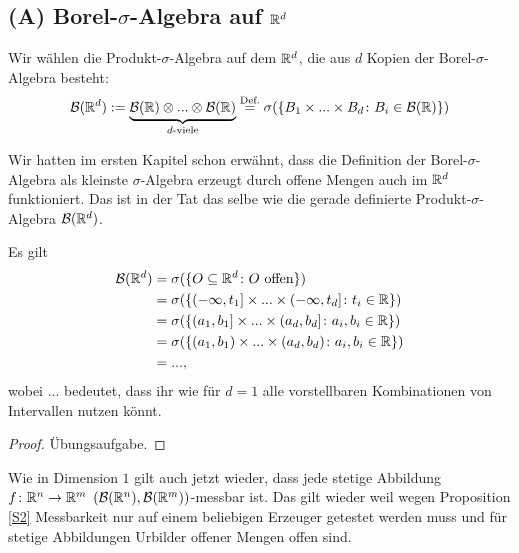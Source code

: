 \subsection*{(A) Borel-$\sigma$-Algebra auf $\mathbb{R}^d$}

\begin{deff}
	Wir w\"ahlen die Produkt-$\sigma$-Algebra auf dem $\mathbb{R}^d$, die aus $d$ Kopien der Borel-$\sigma$-Algebra besteht:
	\[ \mathcal{B}(\mathbb{R}^d) := \underbrace{\mathcal{B}(\mathbb{R}) \otimes ... \otimes \mathcal{B}(\mathbb{R})}_{d\text{-viele}} \overset{\text{Def.}}{=} \sigma(\{ B_1 \times ... \times B_d \colon B_i \in \mathcal{B}(\mathbb{R}) \}) \]
\end{deff}
Wir hatten im ersten Kapitel schon erw\"ahnt, dass die Definition der Borel-$\sigma$-Algebra als kleinste $\sigma$-Algebra erzeugt durch offene Mengen auch im $\mathbb{R}^d$ funktioniert. Das ist in der Tat das selbe wie die gerade definierte Produkt-$\sigma$-Algebra $\mathcal B(\mathbb{R}^d)$. 
\begin{lemma}
	Es gilt 
	\begin{align*}
		\mathcal{B}(\mathbb{R}^d) &= \sigma(\{ O \subseteq \mathbb{R}^d\colon O \text{ offen} \})\\
		& = \sigma(\{ (-\infty,t_1] \times ... \times (-\infty,t_d] \colon t_i \in \mathbb{R} \})\\
		& = \sigma(\{ (a_1,b_1]\times ... \times (a_d,b_d] \colon a_i,b_i \in \mathbb{R} \})\\
		& = \sigma(\{ (a_1,b_1) \times ... \times (a_d,b_d) \colon a_i,b_i \in \mathbb{R} \})\\
		&=...,
	\end{align*}
	wobei ... bedeutet, dass ihr wie f\"ur $d=1$ alle vorstellbaren Kombinationen von Intervallen nutzen k\"onnt.	
\end{lemma}

\begin{proof}
	Übungsaufgabe.
\end{proof}
\begin{bem} 
	Wie in Dimension $1$ gilt auch jetzt wieder, dass jede stetige Abbildung $f\colon \mathbb{R}^n \to \mathbb{R}^m$  $(\mathcal{B}(\mathbb{R}^n), \mathcal{B}(\mathbb{R}^m))$-messbar ist. Das gilt wieder weil wegen Proposition \ref{S2} Messbarkeit nur auf einem beliebigen Erzeuger getestet werden muss und f\"ur stetige Abbildungen Urbilder offener Mengen offen sind.
\end{bem}

